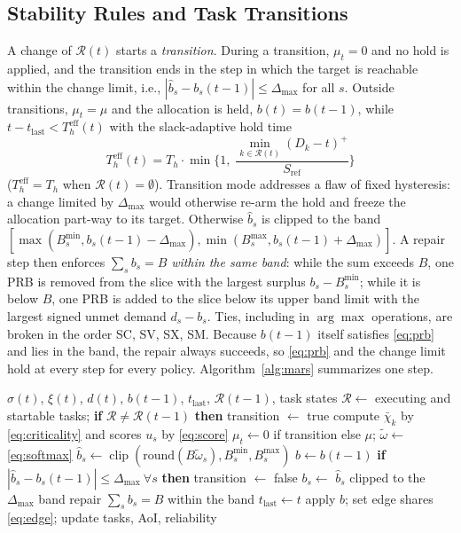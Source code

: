 \documentclass[conference]{IEEEtran}
\DeclareMathOperator{\clip}{clip}
\begin{document}
\subsection{Stability Rules and Task Transitions}
A change of $\mathcal{R}(t)$ starts a \emph{transition}. During a transition, $\mu_t=0$ and no hold is applied, and the transition ends in the step in which the target is reachable within the change limit, i.e., $|\hat b_s-b_s(t-1)|\le\Delta_{\max}$ for all $s$. Outside transitions, $\mu_t=\mu$ and the allocation is held, $b(t)=b(t-1)$, while $t-t_{\mathrm{last}}<T_h^{\mathrm{eff}}(t)$ with the slack-adaptive hold time
\begin{equation}
T_h^{\mathrm{eff}}(t)=T_h\cdot\min\Big\{1,\;\frac{\min_{k\in\mathcal{R}(t)}(D_k-t)^+}{S_{\mathrm{ref}}}\Big\}
\label{eq:hold}
\end{equation}
($T_h^{\mathrm{eff}}=T_h$ when $\mathcal{R}(t)=\emptyset$). Transition mode addresses a flaw of fixed hysteresis: a change limited by $\Delta_{\max}$ would otherwise re-arm the hold and freeze the allocation part-way to its target. Otherwise $\hat b_s$ is clipped to the band $[\max(B_s^{\min},b_s(t-1)-\Delta_{\max}),\min(B_s^{\max},b_s(t-1)+\Delta_{\max})]$. A repair step then enforces $\sum_sb_s=B$ \emph{within the same band}: while the sum exceeds $B$, one PRB is removed from the slice with the largest surplus $b_s-B_s^{\min}$; while it is below $B$, one PRB is added to the slice below its upper band limit with the largest signed unmet demand $d_s-b_s$. Ties, including in $\arg\max$ operations, are broken in the order SC, SV, SX, SM. Because $b(t-1)$ itself satisfies \eqref{eq:prb} and lies in the band, the repair always succeeds, so \eqref{eq:prb} and the change limit hold at every step for every policy. Algorithm~\ref{alg:mars} summarizes one step.

\begin{algorithm}[t]
\caption{One MARS control step at time $t$}
\label{alg:mars}
\small
\begin{algorithmic}[1]
\Require $\sigma(t)$, $\xi(t)$, $d(t)$, $b(t-1)$, $t_{\mathrm{last}}$, $\mathcal{R}(t-1)$, task states
\State $\mathcal{R}\gets$ executing and startable tasks; \textbf{if} $\mathcal{R}\neq\mathcal{R}(t-1)$ \textbf{then} transition $\gets$ true
\State compute $\bar\chi_k$ by \eqref{eq:criticality} and scores $u_s$ by \eqref{eq:score}
\State $\mu_t\gets 0$ if transition else $\mu$;\; $\tilde\omega\gets$ \eqref{eq:softmax}
\State $\hat b_s\gets\clip(\mathrm{round}(B\tilde\omega_s),B_s^{\min},B_s^{\max})$
 \State $b\gets b(t-1)$ 
\Else
\State \textbf{if} $|\hat b_s-b_s(t-1)|\le\Delta_{\max}\ \forall s$ \textbf{then} transition $\gets$ false
\State $b_s\gets$ $\hat b_s$ clipped to the $\Delta_{\max}$ band
\EndIf
\State repair $\sum_s b_s=B$ within the band
 $t_{\mathrm{last}}\gets t$ \EndIf
\State apply $b$; set edge shares \eqref{eq:edge}; update tasks, AoI, reliability
\end{algorithmic}
\end{algorithm}
\end{document}
